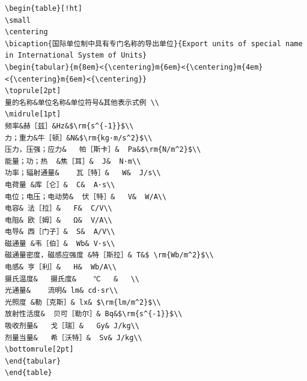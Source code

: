 \begin{lstlisting}[caption={表3.3绘制代码}]
\begin{table}[!ht]
\small
\centering
\bicaption{国际单位制中具有专门名称的导出单位}{Export units of special name in International System of Units} 
\begin{tabular}{m{8em}<{\centering}m{6em}<{\centering}m{4em}<{\centering}m{6em}<{\centering}} 
\toprule[2pt]
量的名称&单位名称&单位符号&其他表示式例 \\
\midrule[1pt]
频率&赫［兹］&Hz&$\rm{s^{-1}}$\\
力；重力&牛［顿］&N&$\rm{kg·m/s^2}$\\
压力，压强；应力&	帕［斯卡］&	Pa&$\rm{N/m^2}$\\
能量；功；热	&焦［耳］&	J&	N·m\\
功率；辐射通量&	瓦［特］&	W&	J/s\\
电荷量	&库［仑］&	C&	A·s\\
电位；电压；电动势&	伏［特］&	V&	W/A\\
电容&	法［拉］&	F&	C/V\\
电阻&	欧［姆］&	Ω&	V/A\\
电导&	西［门子］&	S&	A/V\\
磁通量	&韦［伯］&	Wb&	V·s\\
磁通量密度，磁感应强度	&特［斯拉］&	T&$	\rm{Wb/m^2}$\\
电感&	亨［利］&	H&	Wb/A\\
摄氏温度&	摄氏度&	℃	&   \\
光通量&	流明&	lm&	cd·sr\\
光照度	&勒［克斯］&	lx&	$\rm{lm/m^2}$\\
放射性活度&	贝可［勒尔］&	Bq&$\rm{s^{-1}}$\\
吸收剂量&	戈［瑞］&	Gy&	J/kg\\
剂量当量&	希［沃特］&	Sv&	J/kg\\
\bottomrule[2pt]
\end{tabular}
\end{table}
\end{lstlisting}
